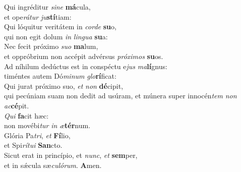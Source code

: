 \evenverse Qui ingréditur \textit{si}\textit{ne} \textbf{má}cula,~\*\\
\evenverse et ope\textit{rá}\textit{tur} \textit{ju}\textbf{stí}tiam:\\
\oddverse Qui lóquitur veritátem in \textit{cor}\textit{de} \textbf{su}o,~\*\\
\oddverse qui non egit dolum \textit{in} \textit{lin}\textit{gua} \textbf{su}a:\\
\evenverse Nec fecit próximo \textit{su}\textit{o} \textbf{ma}lum,~\*\\
\evenverse et oppróbrium non accépit advérsus \textit{pró}\textit{xi}\textit{mos} \textbf{su}os.\\
\oddverse Ad níhilum dedúctus est in conspéctu e\textit{jus} \textit{ma}\textbf{lí}gnus:~\*\\
\oddverse timéntes autem Dó\textit{mi}\textit{num} \textit{glo}\textbf{rí}ficat:\\
\evenverse Qui jurat próximo suo, \textit{et} \textit{non} \textbf{dé}cipit,~\*\\
\evenverse qui pecúniam suam non dedit ad usúram, et múnera super innocén\textit{tem} \textit{non} \textit{ac}\textbf{cé}pit.\\
\oddverse \textit{Qui} \textbf{fa}cit hæc:~\*\\
\oddverse non movébi\textit{tur} \textit{in} \textit{æ}\textbf{tér}num.\\
\evenverse Glória Pa\textit{tri}, \textit{et} \textbf{Fí}lio,~\*\\
\evenverse et Spi\textit{rí}\textit{tu}\textit{i} \textbf{San}cto.\\
\oddverse Sicut erat in princípio, et \textit{nunc}, \textit{et} \textbf{sem}per,~\*\\
\oddverse et in sǽcula sæ\textit{cu}\textit{ló}\textit{rum}. \textbf{A}men.\\

